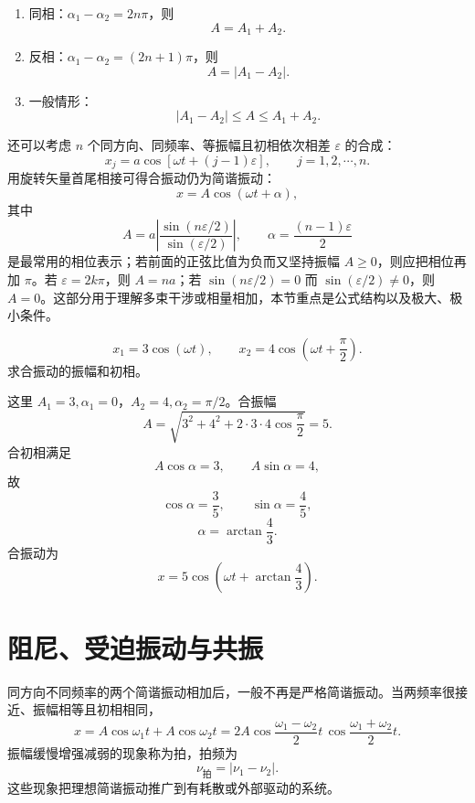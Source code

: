 \begin{summary}[特殊相位差]
\begin{enumerate}
  \item 同相：$\alpha_1-\alpha_2=2n\pi$，则
  \[
    A=A_1+A_2.
  \]
  \item 反相：$\alpha_1-\alpha_2=(2n+1)\pi$，则
  \[
    A=|A_1-A_2|.
  \]
  \item 一般情形：
  \[
    |A_1-A_2|\le A\le A_1+A_2.
  \]
\end{enumerate}
\end{summary}

\begin{attention}
还可以考虑 $n$ 个同方向、同频率、等振幅且初相依次相差 $\varepsilon$ 的合成：
\[
  x_j=a\cos\left[\omega t+(j-1)\varepsilon\right],
  \qquad j=1,2,\cdots,n.
\]
用旋转矢量首尾相接可得合振动仍为简谐振动：
\[
  x=A\cos(\omega t+\alpha),
\]
其中
\[
  A=a\left|\frac{\sin(n\varepsilon/2)}{\sin(\varepsilon/2)}\right|,
  \qquad
  \alpha=\frac{(n-1)\varepsilon}{2}
\]
是最常用的相位表示；若前面的正弦比值为负而又坚持振幅 $A\ge0$，则应把相位再加 $\pi$。若 $\varepsilon=2k\pi$，则 $A=na$；若 $\sin(n\varepsilon/2)=0$ 而 $\sin(\varepsilon/2)\ne0$，则 $A=0$。这部分用于理解多束干涉或相量相加，本节重点是公式结构以及极大、极小条件。
\end{attention}

\begin{example}[title={两同频振动合成}]\label{eg:sum-example}
\[
  x_1=3\cos(\omega t),\qquad
  x_2=4\cos\left(\omega t+\frac{\pi}{2}\right).
\]
求合振动的振幅和初相。

\begin{solution}
这里 $A_1=3,\alpha_1=0$，$A_2=4,\alpha_2=\pi/2$。合振幅
\[
  A=\sqrt{3^2+4^2+2\cdot3\cdot4\cos\frac{\pi}{2}}=5.
\]
合初相满足
\[
  A\cos\alpha=3,\qquad A\sin\alpha=4,
\]
故
\[
  \cos\alpha=\frac35,\qquad \sin\alpha=\frac45,
\]
\[
  \alpha=\arctan\frac43.
\]
合振动为
\[
  x=5\cos\left(\omega t+\arctan\frac43\right).
\]
\end{solution}
\end{example}

\section{阻尼、受迫振动与共振}

\begin{attention}[不同频率合成与拍]
同方向不同频率的两个简谐振动相加后，一般不再是严格简谐振动。当两频率很接近、振幅相等且初相相同，
\[
  x=A\cos\omega_1t+A\cos\omega_2t
  =2A\cos\frac{\omega_1-\omega_2}{2}t\,
     \cos\frac{\omega_1+\omega_2}{2}t.
\]
振幅缓慢增强减弱的现象称为拍，拍频为
\[
  \nu_{\text{拍}}=|\nu_1-\nu_2|.
\]
这些现象把理想简谐振动推广到有耗散或外部驱动的系统。
\end{attention}

